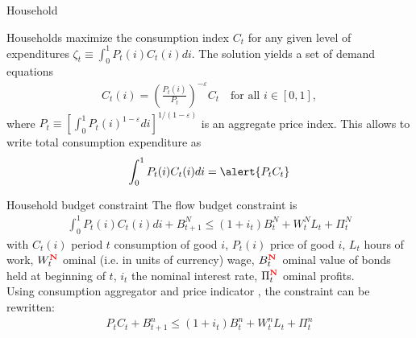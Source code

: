\documentclass{beamer}
\newcommand{\tr}[1]{{\color{red}{\textbf{#1}}}}
\begin{document}
\begin{frame}{Household}

Households maximize the consumption index $C_t$ for any given level of expenditures $\zeta_t \equiv\int_0^1 P_t(i) C_t(i) di$. The solution yields a set of demand equations
\begin{align}
C_t(i) = \left(\frac{P_t(i)}{P_t}\right)^{-\varepsilon}C_t \quad \text{for all }i \in [0,1], \tag{1}
\end{align}
where $P_t \equiv [\int_0^1 P_t(i)^{1-\varepsilon}di]^{1/(1-\varepsilon)}$ is an aggregate price index. This allows to write total consumption expenditure as
\begin{align*}
\int_0^1 P_t(i) C_t(i) di = \alert{P_t C_t}
\end{align*}
\end{frame}

\begin{frame}{Household budget constraint}
The flow budget constraint is
\begin{align*}
  \int_0^1 P_t(i) C_t(i) di + B^N_{t+1} \leq (1+i_t)B^N_{t} + W^N_t L_t + \Pi^N_t 
\end{align*}
with $C_t(i)$ period $t$ consumption of good $i$, $P_t(i)$ price of good $i$, $L_t$ hours of work, $W^{\tr{N}}_t$ \tr{n}ominal (i.e. in units of currency) wage, $B^{\tr{N}}_t$~\tr{n}ominal value of bonds held at beginning of $t$, $i_t$ the nominal interest rate, $\Pi^{\tr{N}}_t$ \tr{n}ominal profits. 
\\ \vfill
Using consumption aggregator and price indicator%
, the constraint can be rewritten:
\begin{align*}
  P_t C_t + B^n_{t+1} \leq (1+i_t)B^n_{t} + W^n_t L_t + \Pi^n_t
\end{align*}

\end{frame}
\end{document}
